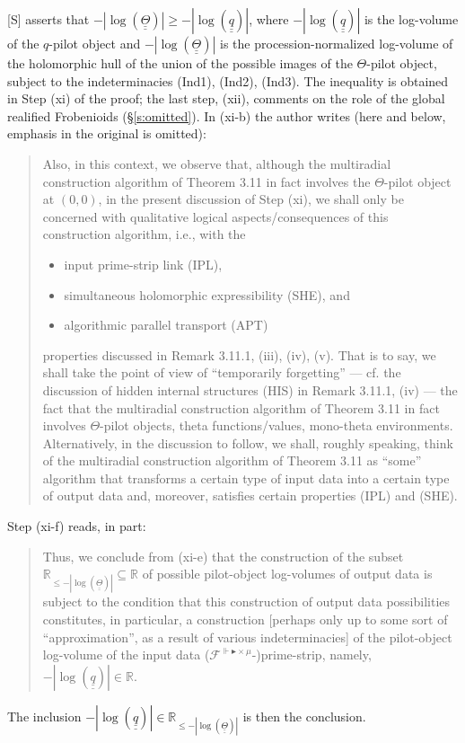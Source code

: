 \documentclass[11pt]{article}
\theoremstyle{plain}
\theoremstyle{definition}
\theoremstyle{remark}
\newcommand{\Smark}{\textup{[S]}}
\newcommand{\qbb}{\underline{\underline q}}
\newcommand{\Thbb}{\underline{\underline\Theta}}
\begin{document}
\Smark{} \cite[Cor.~3.12]{IUT3} asserts that $-|\log(\Thbb)|\ge-|\log(\qbb)|$, where
$-|\log(\qbb)|$ is the log-volume of the $q$-pilot object and $-|\log(\Thbb)|$ is the
procession-normalized log-volume of the holomorphic hull of the union of the possible
images of the $\Theta$-pilot object, subject to the indeterminacies (Ind1), (Ind2),
(Ind3). The inequality is obtained in Step (xi) of the proof; the last step, (xii),
comments on the role of the global realified Frobenioids (\S\ref{s:omitted}). In (xi-b)
the author writes (here and below, emphasis in the original is omitted):
\begin{quote}
Also, in this context, we observe that, although the multiradial construction algorithm of
Theorem 3.11 in fact involves the $\Theta$-pilot object at $(0,0)$, in the present
discussion of Step (xi), we shall only be concerned with qualitative logical
aspects/consequences of this construction algorithm, i.e., with the
\begin{itemize}[label=$\cdot$,leftmargin=1.5em,itemsep=0pt,topsep=2pt]
\item input prime-strip link (IPL),
\item simultaneous holomorphic expressibility (SHE), and
\item algorithmic parallel transport (APT)
\end{itemize}
properties discussed in Remark 3.11.1, (iii), (iv), (v). That is to say, we shall take the
point of view of ``temporarily forgetting'' --- cf. the discussion of hidden internal
structures (HIS) in Remark 3.11.1, (iv) --- the fact that the multiradial construction
algorithm of Theorem 3.11 in fact involves $\Theta$-pilot objects, theta functions/values,
mono-theta environments. Alternatively, in the discussion to follow, we shall, roughly
speaking, think of the multiradial construction algorithm of Theorem 3.11 as ``some''
algorithm that transforms a certain type of input data into a certain type of output data
and, moreover, satisfies certain properties (IPL) and (SHE).
\end{quote}
Step (xi-f) reads, in part:
\begin{quote}
Thus, we conclude from (xi-e) that the construction of the subset
$\mathbb R_{\le-|\log(\Thbb)|}\subseteq\mathbb R$ of possible pilot-object
log-volumes of output data is subject to the condition that this construction of output
data possibilities constitutes, in particular, a construction [perhaps only up to some
sort of ``approximation'', as a result of various indeterminacies] of the pilot-object
log-volume of the input data \textup{(}$\mathcal F^{\Vdash\blacktriangleright\times\mu}$-\textup{)}prime-strip,
namely, $-|\log(\qbb)|\in\mathbb R$.
\end{quote}
The inclusion $-|\log(\qbb)|\in\mathbb R_{\le-|\log(\Thbb)|}$ is then the conclusion.
\end{document}
